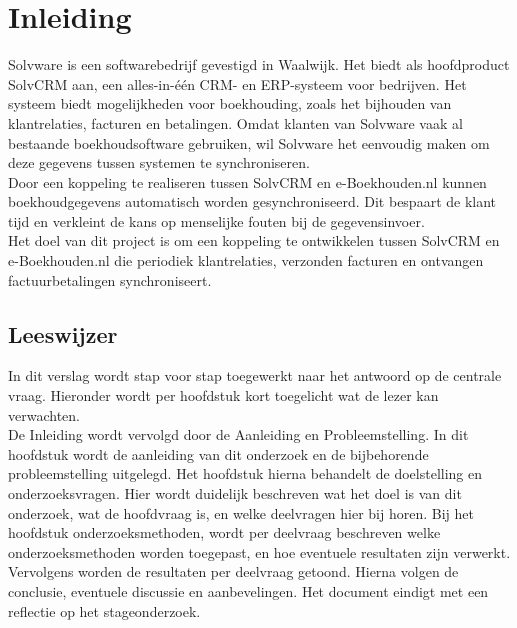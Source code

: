 \chapter{Inleiding}

Solvware is een softwarebedrijf gevestigd in Waalwijk.
Het biedt als hoofdproduct SolvCRM aan, een alles-in-één CRM- en ERP-systeem voor bedrijven.
Het systeem biedt mogelijkheden voor boekhouding, zoals het bijhouden van klantrelaties, facturen en betalingen.
Omdat klanten van Solvware vaak al bestaande boekhoudsoftware gebruiken, wil Solvware het eenvoudig maken om deze gegevens tussen systemen te synchroniseren.\\
Door een koppeling te realiseren tussen SolvCRM en e-Boekhouden.nl kunnen boekhoudgegevens automatisch worden gesynchroniseerd.
Dit bespaart de klant tijd en verkleint de kans op menselijke fouten bij de gegevensinvoer.\\
Het doel van dit project is om een koppeling te ontwikkelen tussen SolvCRM en e-Boekhouden.nl die periodiek klantrelaties, verzonden facturen en ontvangen factuurbetalingen synchroniseert.

\section{Leeswijzer}
In dit verslag wordt stap voor stap toegewerkt naar het antwoord op de centrale vraag.
Hieronder wordt per hoofdstuk kort toegelicht wat de lezer kan verwachten.\\
De Inleiding wordt vervolgd door de Aanleiding en Probleemstelling.
In dit hoofdstuk wordt de aanleiding van dit onderzoek en de bijbehorende probleemstelling uitgelegd.
Het hoofdstuk hierna behandelt de doelstelling en onderzoeksvragen.
Hier wordt duidelijk beschreven wat het doel is van dit onderzoek, wat de hoofdvraag is, en welke deelvragen hier bij horen.
Bij het hoofdstuk onderzoeksmethoden, wordt per deelvraag beschreven welke onderzoeksmethoden worden toegepast, en hoe eventuele resultaten zijn verwerkt.
Vervolgens worden de resultaten per deelvraag getoond.
Hierna volgen de conclusie, eventuele discussie en aanbevelingen.
Het document eindigt met een reflectie op het stageonderzoek.
